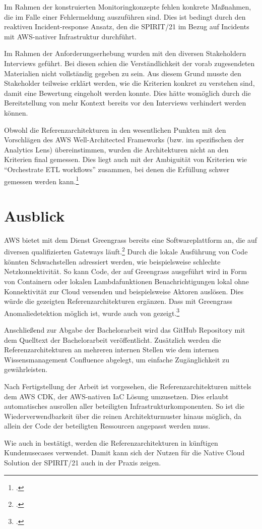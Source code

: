 Im Rahmen der konstruierten Monitoringkonzepte fehlen konkrete Maßnahmen, die im Falle einer Fehlermeldung auszuführen sind. Dies ist bedingt durch den reaktiven Incident-response Ansatz, den die SPIRIT/21 im Bezug auf Incidents mit \ac{AWS}-nativer Infrastruktur durchführt.

Im Rahmen der Anforderungserhebung wurden mit den diversen Stakeholdern Interviews geführt. Bei diesen schien die Verständlichkeit der vorab zugesendeten Materialien nicht vollständig gegeben zu sein. Aus diesem Grund musste den Stakeholder teilweise erklärt werden, wie die Kriterien konkret zu verstehen sind, damit eine Bewertung eingeholt werden konnte. Dies hätte womöglich durch die Bereitstellung von mehr Kontext bereits vor den Interviews verhindert werden können.

Obwohl die Referenzarchitekturen in den wesentlichen Punkten mit den Vorschlägen des \ac{AWS} Well-Architected Frameworks (bzw. im spezifischen der Analytics Lens) übereinstimmen, wurden die Architekturen nicht an den Kriterien final gemessen. Dies liegt auch mit der Ambiguität von Kriterien wie \enquote{Orchestrate ETL workflows} zusammen, bei denen die Erfüllung schwer gemessen werden kann.\footcite[Vgl.][6]{Ravirala.2020}


\section{Ausblick}
\ac{AWS} bietet mit dem Dienst Greengrass bereits eine Softwareplattform an, die auf diversen qualifizierten Gateways läuft.\footcite[Vgl. auch im Folgenden][]{AmazonWebServicesInc..o.J.bu} Durch die lokale Ausführung von Code könnten Schwachstellen adressiert werden, wie beispielsweise schlechte Netzkonnektivität. So kann Code, der auf Greengrass ausgeführt wird in Form von Containern oder lokalen Lambdafunktionen Benachrichtigungen lokal ohne Konnektivität zur Cloud versenden und beispielsweise Aktoren auslösen. Dies würde die gezeigten Referenzarchitekturen ergänzen. Dass mit Greengrass Anomaliedetektion möglich ist, wurde auch von \citeauthor{Shankar.2020} gezeigt.\footcite[Vgl.][]{Shankar.2020}

Anschließend zur Abgabe der Bachelorarbeit wird das GitHub Repository mit dem Quelltext der Bachelorarbeit veröffentlicht. Zusätzlich werden die Referenzarchitekturen an mehreren internen Stellen wie dem internen Wissensmanagement Confluence abgelegt, um einfache Zugänglichkeit zu gewährleisten.

Nach Fertigstellung der Arbeit ist vorgesehen, die Referenzarchitekturen mittels dem \ac{AWS} \ac{CDK}, der \ac{AWS}-nativen \ac{IaC} Lösung umzusetzen. Dies erlaubt automatisches ausrollen aller beteiligten Infrastrukturkomponenten. So ist die Wiederverwendbarkeit über die reinen Architekturmuster hinaus möglich, da allein der Code der beteiligten Ressourcen angepasst werden muss.

Wie auch in  bestätigt, werden die Referenzarchitekturen in künftigen Kundenusecases verwendet. Damit kann sich der Nutzen für die Native Cloud Solution der SPIRIT/21 auch in der Praxis zeigen.